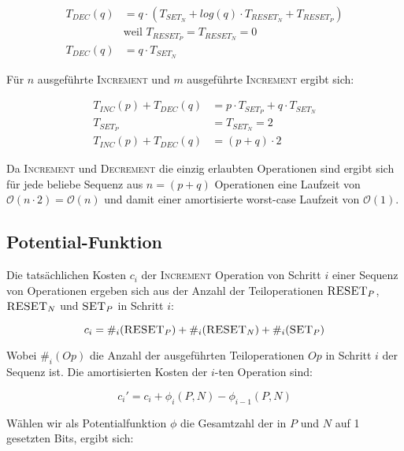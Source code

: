 \documentclass[parskip=half,a4paper]{scrartcl}
\begin{document}
\begin{equation}
\begin{aligned}
T_{DEC}(q) &= q \cdot (T_{SET_N} + log(q) \cdot T_{RESET_N} + T_{RESET_P}) \\
& \text{weil  $T_{RESET_P} = T_{RESET_N} = 0$} \\
T_{DEC}(q)  &= q \cdot T_{SET_N}
\end{aligned}
\end{equation}

Für $n$ ausgeführte \textsc{Increment} und $m$ ausgeführte \textsc{Increment} ergibt sich:

\begin{equation}
\begin{aligned}
T_{INC}(p) + T_{DEC}(q) &= p \cdot T_{SET_P} + q \cdot T_{SET_N}\\
T_{SET_P} &= T_{SET_N} = 2 \\
T_{INC}(p) + T_{DEC}(q) &= (p+q) \cdot 2
\end{aligned}
\end{equation}

Da \textsc{Increment} und \textsc{Decrement} die einzig erlaubten Operationen sind ergibt sich für jede beliebe Sequenz aus $n = (p+q)$ Operationen eine Laufzeit von $\mathcal{O}(n\cdot 2) = \mathcal{O}(n)$ und damit einer amortisierte worst-case Laufzeit von $\mathcal{O}(1)$.

\subsection*{Potential-Funktion}

Die tatsächlichen Kosten $c_i$ der \textsc{Increment} Operation von Schritt $i$ einer Sequenz von Operationen ergeben sich aus der Anzahl der Teiloperationen $\textsc{RESET}_P$, $\textsc{RESET}_N$ und $\textsc{SET}_P$ in Schritt $i$:

$$
c_i = \#_i(\textsc{RESET}_P) + \#_i(\textsc{RESET}_N) + \#_i(\textsc{SET}_P)
$$

Wobei $\#_i(\textit{Op})$ die Anzahl der ausgeführten Teiloperationen $\textit{Op}$ in Schritt $i$ der Sequenz ist. Die amortisierten Kosten der $i$-ten Operation sind:

\begin{equation}
c_i' = c_i + \phi_i(P,N) - \phi_{i-1}(P,N)
\end{equation}

Wählen wir als Potentialfunktion $\phi$ die Gesamtzahl der in $P$ und $N$ auf 1 gesetzten Bits, ergibt sich:
\end{document}
